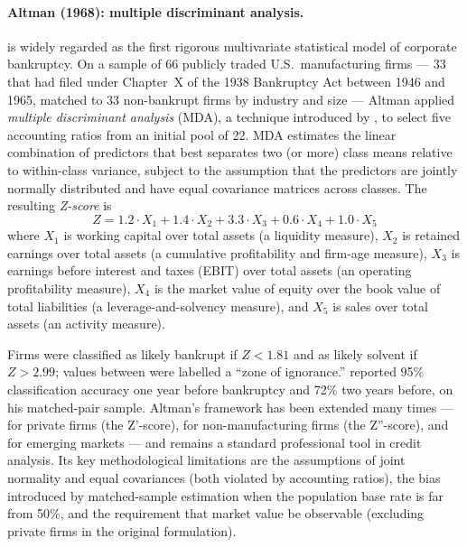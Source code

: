 \documentclass[11pt,a4paper]{article}
\begin{document}
\paragraph{Altman (1968): multiple discriminant analysis.}
\cite{altman1968} is widely regarded as the first rigorous multivariate
statistical model of corporate bankruptcy. On a sample of 66 publicly traded
U.S.\ manufacturing firms --- 33 that had filed under Chapter~X of the 1938
Bankruptcy Act between 1946 and 1965, matched to 33 non-bankrupt firms by
industry and size --- Altman applied \textit{multiple discriminant analysis}
(MDA), a technique introduced by \cite{fisher1936}, to select five
accounting ratios from an initial pool of 22. MDA estimates the linear
combination of predictors that best separates two (or more) class means
relative to within-class variance, subject to the assumption that the
predictors are jointly normally distributed and have equal covariance
matrices across classes. The resulting \textit{Z-score} is
\begin{equation}
Z = 1.2 \cdot X_1 + 1.4 \cdot X_2 + 3.3 \cdot X_3 + 0.6 \cdot X_4 + 1.0 \cdot X_5
\label{eq:altman}
\end{equation}
where $X_1$ is working capital over total assets (a liquidity measure), $X_2$
is retained earnings over total assets (a cumulative profitability and
firm-age measure), $X_3$ is earnings before interest and taxes (EBIT) over
total assets (an operating profitability measure), $X_4$ is the market value
of equity over the book value of total liabilities (a leverage-and-solvency
measure), and $X_5$ is sales over total assets (an activity measure).

Firms were classified as likely bankrupt if $Z < 1.81$ and as likely solvent
if $Z > 2.99$; values between were labelled a ``zone of ignorance.''
\cite{altman1968} reported 95\% classification accuracy one year before
bankruptcy and 72\% two years before, on his matched-pair sample.
Altman's framework has been extended many times --- \cite{altman2000} for
private firms (the Z'-score), for non-manufacturing firms (the Z''-score), and
for emerging markets --- and remains a standard professional tool in credit
analysis. Its key methodological limitations are the assumptions of joint
normality and equal covariances (both violated by accounting ratios), the
bias introduced by matched-sample estimation when the population base rate is
far from 50\%, and the requirement that market value be observable (excluding
private firms in the original formulation).
\end{document}
